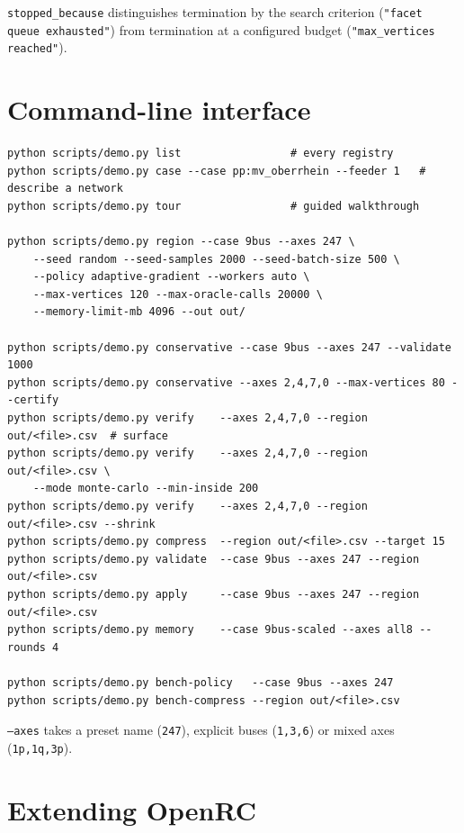 \documentclass[11pt,a4paper]{report}
\newcommand{\code}[1]{\texttt{\small #1}}
\begin{document}
\code{stopped\_because} distinguishes termination by the search criterion
(\code{"facet queue exhausted"}) from termination at a configured budget
(\code{"max\_vertices reached"}).

\chapter{Command-line interface}
\label{ch:cli}

\begin{lstlisting}[style=sh]
python scripts/demo.py list                 # every registry
python scripts/demo.py case --case pp:mv_oberrhein --feeder 1   # describe a network
python scripts/demo.py tour                 # guided walkthrough

python scripts/demo.py region --case 9bus --axes 247 \
    --seed random --seed-samples 2000 --seed-batch-size 500 \
    --policy adaptive-gradient --workers auto \
    --max-vertices 120 --max-oracle-calls 20000 \
    --memory-limit-mb 4096 --out out/

python scripts/demo.py conservative --case 9bus --axes 247 --validate 1000
python scripts/demo.py conservative --axes 2,4,7,0 --max-vertices 80 --certify
python scripts/demo.py verify    --axes 2,4,7,0 --region out/<file>.csv  # surface
python scripts/demo.py verify    --axes 2,4,7,0 --region out/<file>.csv \
    --mode monte-carlo --min-inside 200
python scripts/demo.py verify    --axes 2,4,7,0 --region out/<file>.csv --shrink
python scripts/demo.py compress  --region out/<file>.csv --target 15
python scripts/demo.py validate  --case 9bus --axes 247 --region out/<file>.csv
python scripts/demo.py apply     --case 9bus --axes 247 --region out/<file>.csv
python scripts/demo.py memory    --case 9bus-scaled --axes all8 --rounds 4

python scripts/demo.py bench-policy   --case 9bus --axes 247
python scripts/demo.py bench-compress --region out/<file>.csv
\end{lstlisting}

\code{--axes} takes a preset name (\code{247}), explicit buses (\code{1,3,6}) or
mixed axes (\code{1p,1q,3p}).

\chapter{Extending OpenRC}
\label{ch:extend}
\end{document}
